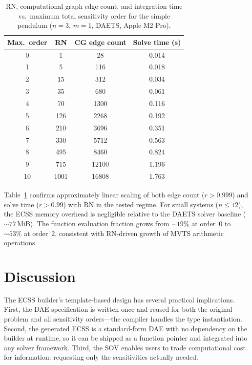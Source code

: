\documentclass[12pt,a4paper]{article}
\theoremstyle{definition}
\theoremstyle{plain}
\theoremstyle{remark}
\begin{document}
\begin{table}[htbp]
  \centering
  \caption{RN, computational graph edge count, and integration time vs.\ maximum total sensitivity order for the simple pendulum ($n=3$, $m=1$, DAETS, Apple M2 Pro).}
  \label{tab:performance}
  \begin{tabular}{cccc}
    \toprule
    Max.\ order & RN & CG edge count & Solve time (s) \\
    \midrule
    0  & 1    & 28    & 0.014 \\
    1  & 5    & 116   & 0.018 \\
    2  & 15   & 312   & 0.034 \\
    3  & 35   & 680   & 0.061 \\
    4  & 70   & 1300  & 0.116 \\
    5  & 126  & 2268  & 0.192 \\
    6  & 210  & 3696  & 0.351 \\
    7  & 330  & 5712  & 0.563 \\
    8  & 495  & 8460  & 0.824 \\
    9  & 715  & 12100 & 1.196 \\
    10 & 1001 & 16808 & 1.763 \\
    \bottomrule
  \end{tabular}
\end{table}

Table~\ref{tab:performance} confirms approximately linear scaling of both edge count ($r>0.999$) and solve time ($r>0.99$) with RN in the tested regime. For small systems ($n\le 12$), the ECSS memory overhead is negligible relative to the DAETS solver baseline (${\sim}77$\,MiB). The function evaluation fraction grows from ${\sim}19\%$ at order~0 to ${\sim}53\%$ at order~2, consistent with RN-driven growth of MVTS arithmetic operations.

\section{Discussion}

The ECSS builder's template-based design has several practical implications. First, the DAE specification is written once and reused for both the original problem and all sensitivity orders---the compiler handles the type instantiation. Second, the generated ECSS is a standard-form DAE with no dependency on the builder at runtime, so it can be shipped as a function pointer and integrated into any solver framework. Third, the SOV enables users to trade computational cost for information: requesting only the sensitivities actually needed.
\end{document}
